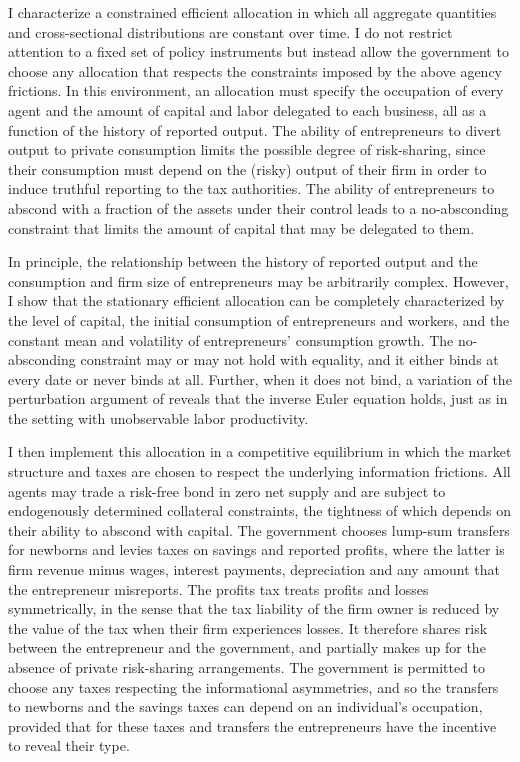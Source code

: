 \documentclass[11pt]{article}
\theoremstyle{plain}
\theoremstyle{definition} %
\begin{document}
I characterize a constrained efficient allocation in which all aggregate quantities and cross-sectional distributions are constant over time. I do not restrict attention to a fixed set of policy instruments but instead allow the government to choose any allocation that respects the constraints imposed by the above agency frictions. In this environment, an allocation must specify the occupation of every agent and the amount of capital and labor delegated to each business, all as a function of the history of reported output. The ability of entrepreneurs to divert output to private consumption limits the possible degree of risk-sharing, since their consumption must depend on the (risky) output of their firm in order to induce truthful reporting to the tax authorities. The ability of entrepreneurs to abscond with a fraction of the assets under their control leads to a no-absconding constraint that limits the amount of capital that may be delegated to them.

In principle, the relationship between the history of reported output and the consumption and firm size of entrepreneurs may be arbitrarily complex. However, I show that the stationary efficient allocation can be completely characterized by the level of capital, the initial consumption of entrepreneurs and workers, and the constant mean and volatility of entrepreneurs' consumption growth. The no-absconding constraint may or may not hold with equality, and it either binds at every date or never binds at all. Further, when it does not bind, a variation of the perturbation argument of \cite{rogerson_repeated_1985} reveals that the inverse Euler equation holds, just as in the setting with unobservable labor productivity. 

I then implement this allocation in a competitive equilibrium in which the market structure and taxes are chosen to respect the underlying information frictions. All agents may trade a risk-free bond in zero net supply and are subject to endogenously determined collateral constraints, the tightness of which depends on their ability to abscond with capital. The government chooses lump-sum transfers for newborns and levies taxes on savings and reported profits, where the latter is firm revenue minus wages, interest payments, depreciation and any amount that the entrepreneur misreports. The profits tax treats profits and losses symmetrically, in the sense that the tax liability of the firm owner is reduced by the value of the tax when their firm experiences losses. It therefore shares risk between the entrepreneur and the government, and partially makes up for the absence of private risk-sharing arrangements. The government is permitted to choose any taxes respecting the informational asymmetries, and so the transfers to newborns and the savings taxes can depend on an individual's occupation, provided that for these taxes and transfers the entrepreneurs have the incentive to reveal their type. 
\end{document}
